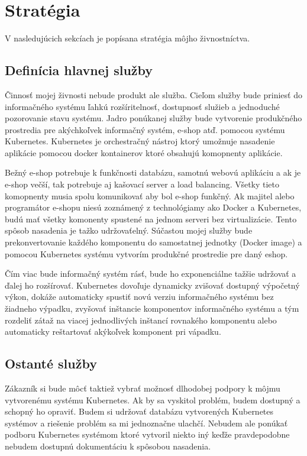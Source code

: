 \chapter{Stratégia}

V nasledujúcich sekcíach je popísana stratégia môjho živnostníctva.

\section{Definícia hlavnej služby}
Činnosť mojej živnosti nebude produkt ale služba. Cieľom služby bude priniesť do informačného systému ľahkú rozšíritelnosť, dostupnosť služieb a jednoduché pozorovanie stavu systému. Jadro ponúkanej služby bude vytvorenie produkčného prostredia pre akýchkoľvek informačný systém, e-shop atď. pomocou systému Kubernetes. Kubernetes je orchestračný nástroj ktorý umožnuje nasadenie aplikácie pomocou docker kontainerov ktoré obsahujú komopnenty aplikácie. 

Bežný e-shop potrebuje k funkčnosti databázu, samotnú webovú aplikáciu a ak je e-shop večší, tak potrebuje aj kašovací server a load balancing. Všetky tieto komopnenty musia spolu komunikovať aby bol e-shop funkčný. Ak majitel alebo programátor e-shopu niesú zoznámený z technológiamy ako Docker a Kubernetes, budú mať všetky komonenty spustené na jednom serveri bez virtualizácie. Tento spôsob nasadenia je tažko udržovaťelný. Súčastou mojej služby bude prekonvertovanie každého komponentu do samostatnej jednotky (Docker image) a pomocou Kubernetes systému vytvorím produkčné prostredie pre daný eshop.

Čím viac bude informačný systém rásť, bude ho exponenciálne tažšie udržovať a ďalej ho rozšírovať. Kubernetes dovoľuje dynamicky zvišovať dostupný výpočetný výkon, dokáže automaticky spustiť novú verziu informačného systému bez žiadneho výpadku, zvyšovať inštancie komponentov informačného systému a tým rozdeliť zátaž na viacej jednodlivých inštancí rovnakého komponentu alebo automaticky reštartovať akýkoľvek komponent pri vápadku. 

\section{Ostanté služby}
Zákazník si bude môcť taktiež vybrať možnosť dlhodobej podpory k môjmu vytvorenému systému Kubernetes. Ak by sa vyskitol problém, budem dostupný a schopný ho opraviť. Budem si udržovať databázu vytvorených Kubernetes systémov a riešenie problém sa mi jednoznačne ulachčí. Nebudem ale ponúkať podboru Kubernetes systémom ktoré vytvoril niekto iný keďže pravdepodobne nebudem dostupnú dokumentáciu k spôsobou nasadenia.

